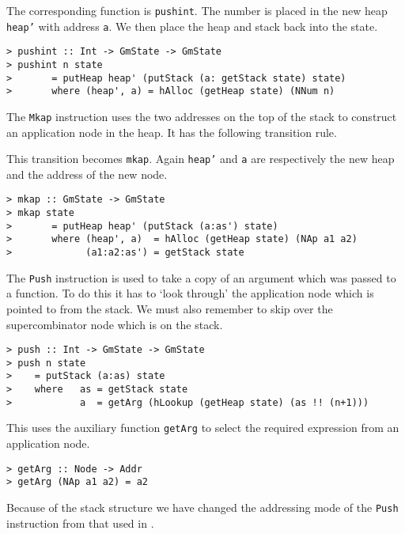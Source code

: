 \gmrule%
{}%
{}

The corresponding function is \mbox{\tt pushint}.
The number is placed in the new heap \mbox{\tt heap'} with address \mbox{\tt a}. We then
place the heap and stack back into the state.
\begin{verbatim}
> pushint :: Int -> GmState -> GmState
> pushint n state
>       = putHeap heap' (putStack (a: getStack state) state)
>       where (heap', a) = hAlloc (getHeap state) (NNum n)
\end{verbatim}
%
%
\par
The \mbox{\tt Mkap} instruction uses the two addresses on the top of the stack
to construct an application node in the heap. It has the following
transition rule.

\gmrule%
{}%
{}

This transition becomes \mbox{\tt mkap}. Again \mbox{\tt heap'} and \mbox{\tt a} are respectively
the new heap and the address of the new node.
\begin{verbatim}
> mkap :: GmState -> GmState
> mkap state
>       = putHeap heap' (putStack (a:as') state)
>       where (heap', a)  = hAlloc (getHeap state) (NAp a1 a2)
>             (a1:a2:as') = getStack state
\end{verbatim}
%
%
\par
The \mbox{\tt Push} instruction is used to take a copy of an argument which was
passed to a function. To do this it has to `look through' the
application node which is pointed to from the stack. We must also
remember to skip over the supercombinator node which is on the stack.

\gmrule%
{}%
{}
\begin{verbatim}
> push :: Int -> GmState -> GmState
> push n state
>    = putStack (a:as) state
>    where   as = getStack state
>            a  = getArg (hLookup (getHeap state) (as !! (n+1)))
\end{verbatim}
%
%
This uses the auxiliary function \mbox{\tt getArg} to select the required
expression from an application node.
\begin{verbatim}
> getArg :: Node -> Addr
> getArg (NAp a1 a2) = a2
\end{verbatim}
%
%
\begin{important}
Because of the stack structure we have changed the addressing mode of
the \mbox{\tt Push} instruction from that used in \cite{PJBook}.
\end{important}

